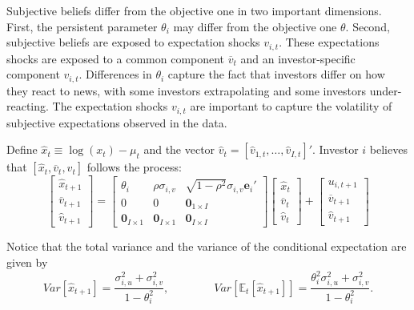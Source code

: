Subjective beliefs differ from the objective one in two important dimensions. First, the persistent parameter $\theta_i$ may differ from the objective one $\theta$. 
Second, subjective beliefs are exposed to expectation shocks $v_{i,t}$. 
These expectations shocks are exposed to a common component $\overline{v}_t$ and an investor-specific component $v_{i,t}$.
Differences in $\theta_i$ capture the fact that investors differ on how they react to news, with some investors extrapolating and some investors under-reacting. 
The expectation shocks $v_{i,t}$ are important to capture the volatility of subjective expectations observed in the data. 

Define  $\hat{x}_t \equiv \log (x_{t}) - \mu_t$ and the vector $\hat{v}_t = [\hat{v}_{1,t}, \ldots, \hat{v}_{I,t}]'$. Investor $i$ believes that $[\hat{x}_{t}, \overline{v}_t, \hat{v}_t]$ follows the process:
\begin{equation}
    \left[
    \begin{matrix}
        \hat{x}_{t+1}\\
        \overline{v}_{t+1}\\
        \hat{v}_{t+1}
    \end{matrix}
    \right] = 
    \left[ 
    \begin{matrix}
    \theta_i & \rho \sigma_{i,v} & \sqrt{1-\rho^2} \sigma_{i,v}\textbf{e}_i'\\
    0 & 0 & \textbf{0}_{1\times I}\\
    \textbf{0}_{I\times 1} & \textbf{0}_{I\times 1} & \textbf{0}_{I\times I}
    \end{matrix}
    \right] \left[
    \begin{matrix}
        \hat{x}_{t}\\
        \overline{v}_t\\
        \hat{v}_{t}
    \end{matrix}
    \right]  +\left[ 
    \begin{matrix}
    u_{i,t+1}\\
    \overline{v}_{t+1}\\
    \hat{v}_{t+1}
    \end{matrix}
    \right] 
\end{equation}

Notice that the total variance and the variance of the conditional expectation are given by
\begin{equation}
    Var[\hat{x}_{t+1}] = \frac{\sigma_{i,u}^2 + \sigma_{i,v}^2}{1-\theta_i^2}, \qquad \qquad Var[\mathbb{E}_t[\hat{x}_{t+1}]] =  \frac{\theta_i^2 \sigma_{i,u}^2 + \sigma_{i,v}^2}{1-\theta_i^2}.
\end{equation}

